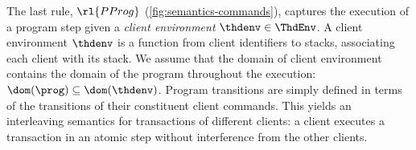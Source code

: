 The last rule, \( \rl{PProg} \) (\cref{fig:semantics-commands}),
captures the execution of a program step 
given a \emph{client environment} \(\thdenv \in \ThdEnv\).
A client environment \(\thdenv\) is a function from client identifiers to stacks, associating each client with its stack. 
We assume that the domain of client environment contains 
the domain of the program throughout the execution: 
\(\dom(\prog) \subseteq \dom(\thdenv)\).
Program transitions are simply defined in terms of the transitions of
their constituent client commands. 
This yields an interleaving semantics for transactions of different clients:  
a client executes a transaction in an atomic step without
interference from the  other clients. 
